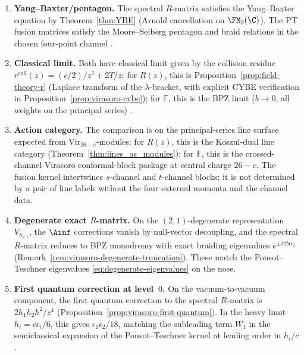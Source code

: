 \begin{proposition}
\label{prop:threefold-evidence}
\begin{enumerate}[label=\textup{(\roman*)}]
\item \textbf{Yang--Baxter/pentagon.} The spectral $R$-matrix
 satisfies the Yang--Baxter equation by
 Theorem~\textup{\ref{thm:YBE}} (Arnold cancellation on
 $\FM_3(\C)$). The PT fusion matrices satisfy the Moore--Seiberg
 pentagon and braid relations in the chosen four-point channel
 \textup{\cite{PT01, TeschnerLiouville}}.

\item \textbf{Classical limit.} Both have classical limit
 given by the collision residue
 $r^{\mathrm{coll}}(z) = (c/2)/z^3 + 2T/z$: for $R(z)$,
 this is Proposition~\textup{\ref{prop:field-theory-r}} (Laplace
 transform of the $\lambda$-bracket, with explicit CYBE verification
 in Proposition~\textup{\ref{prop:virasoro-cybe}}); for $\mathbb{F}$,
 this is the BPZ limit ($b \to 0$, all weights on the principal
 series) \textup{\cite{TeschnerLiouville}}.

\item \textbf{Action category.}
 The comparison is on the principal-series line surface expected from
 $\mathrm{Vir}_{26-c}$-modules: for $R(z)$, this is the Koszul-dual
 line category (Theorem~\textup{\ref{thm:lines_as_modules}}); for
 $\mathbb{F}$, this is the crossed-channel Virasoro conformal-block
 package at central charge $26-c$. The fusion kernel intertwines
 $s$-channel and $t$-channel blocks; it is not determined by a pair of
 line labels without the four external momenta and the channel data.

\item \textbf{Degenerate exact $R$-matrix.}
 On the $(2,1)$-degenerate representation $V_{h_{2,1}}$, the
 $\Ainf$ corrections vanish by null-vector decoupling, and the
 spectral $R$-matrix reduces to BPZ monodromy with exact
 braiding eigenvalues $e^{\pm i\pi b\alpha_2}$
 \textup{(}Remark~\textup{\ref{rem:virasoro-degenerate-truncation}}\textup{)}.
 These match the Ponsot--Teschner eigenvalues
 \eqref{eq:degenerate-eigenvalues} on the nose.

\item \textbf{First quantum correction at level~$0$.}
 On the vacuum-to-vacuum component, the first quantum correction
 to the spectral $R$-matrix is $2h_1 h_2 \hbar^2/z^4$
 \textup{(}Proposition~\textup{\ref{prop:virasoro-first-quantum}}\textup{)}.
 In the heavy limit $h_i = c\epsilon_i/6$, this gives
 $\epsilon_1\epsilon_2/18$, matching the subleading term $W_1$ in
 the semiclassical expansion of the Ponsot--Teschner kernel at
 leading order in $h_i/c$.
\end{enumerate}
\end{proposition}
\label{subsec:evidence-category}

